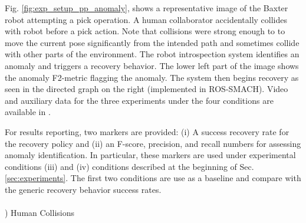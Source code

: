 \documentclass[letterpaper, 10 pt, conference]{ieeeconf}  %
\begin{document}
Fig. \ref{fig:exp_setup_pp_anomaly}, shows a representative image of the Baxter robot attempting a pick operation. A human collaborator accidentally collides with robot before a pick action. Note that collisions were strong enough to to move the current pose significantly from the intended path and sometimes collide with other parts of the environment. The robot introspection system identifies an anomaly and triggers a recovery behavior. The lower left part of the image shows the anomaly F2-metric flagging the anomaly. The system then begins recovery as seen in the directed graph on the right (implemented in ROS-SMACH). Video and auxiliary data for the three experiments under the four conditions are available in \cite{2017Humanoids-Rojas-supplementalURL}.
\begin{figure*}[thb]     
	\centering		
		\caption{Two examples (pick-and-place and open-and-close-drawer) in which a human collaborator accidentally collides the robot. The introspection system identifies an anomaly (see bottom left plots) and triggers a recovery behavior (see the fluorescent node in the graph on the right).}
        \label{fig:exp_setup_pp_anomaly}        
\end{figure*}
For results reporting, two markers are provided: (i) A success recovery rate for the recovery policy and (ii) an F-score, precision, and recall numbers for assessing anomaly identification. In particular, these markers are used under  experimental conditions (iii) and (iv) conditions described at the beginning of Sec. \ref{sec:experiments}. The first two conditions are use as a baseline and compare with the generic recovery behavior success rates. \\\\
\theExperiment) {Human Collisions}\\
\end{document}

